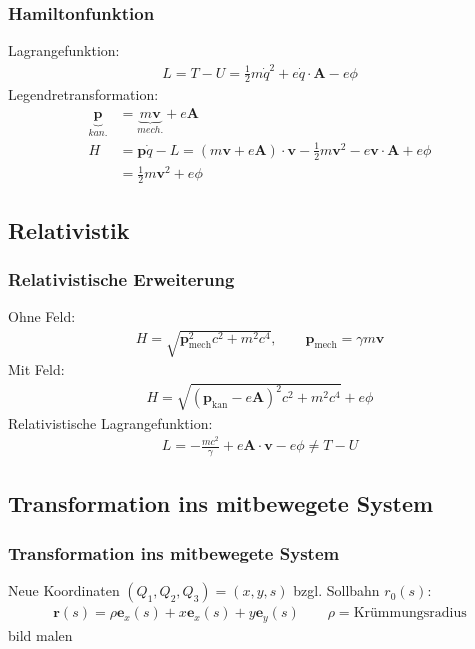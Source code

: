 \documentclass[hyperref={pdfpagelabels=false}]{beamer}
\begin{document}
\begin{frame}
 \frametitle{Hamiltonfunktion}
 \pause
 Lagrangefunktion:
 \begin{align*}
  L = T-U = \frac12 m \dot{q}^2 + e\dot{q}\cdot\mathbf{A} - e\phi
 \end{align*}
 Legendretransformation:
 \begin{align*}
  \underbrace{\mathbf{p}}_{kan.} &= \underbrace{m\mathbf{v}}_{mech.} + e\mathbf{A}\\
  H &= \mathbf{p}\dot{q} - L = (m\mathbf{v}+e\mathbf{A})\cdot \mathbf{v} - \frac12 m \mathbf{v}^2 - e \mathbf{v}\cdot\mathbf{A} + e\phi \\
  &= \frac12m\mathbf{v}^2 + e\phi
 \end{align*}
\end{frame}


\subsection{Relativistik}
 \begin{frame}
    \frametitle{Relativistische Erweiterung}
    \pause
  Ohne Feld:
  \begin{align*}
    H = \sqrt{\mathbf{p}^2_{\text{mech}}c^2 + m^2c^4},    \qquad \mathbf{p}_{\text{mech}} = \gamma m\mathbf{v}
  \end{align*}
  Mit Feld:
  \begin{align*}
   H = \sqrt{(\mathbf{p}_{\text{kan}}-e\mathbf{A})^2c^2 + m^2c^4}+e\phi
  \end{align*}
  Relativistische Lagrangefunktion:
  \begin{align*}
   L = -\frac{mc^2}{\gamma} + e \mathbf{A}\cdot\mathbf{v}-e\phi \neq T-U
  \end{align*}

 \end{frame}


\subsection{Transformation ins mitbewegete System}
\begin{frame}
\frametitle{Transformation ins mitbewegete System}
\pause
Neue Koordinaten $(Q_1,Q_2,Q_3) = (x,y,s)$ bzgl. Sollbahn $r_0(s)$:
\begin{align*}
 \mathbf{r}(s) = \rho\mathbf{e}_x(s) + x\mathbf{e}_x(s) + y\mathbf{e}_y(s) \qquad \rho = \text{Krümmungsradius}
\end{align*}
bild malen

\end{frame}
\end{document}
